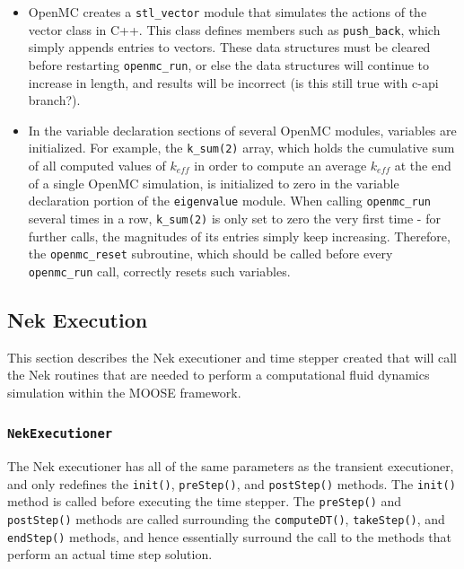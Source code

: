 \documentclass[10pt]{article}
\numberwithin{equation}{section} %
\begin{document}
\begin{itemize}
\item OpenMC creates a {\tt stl\_vector} module that simulates the actions of the vector class in C++. This class defines members such as {\tt push\_back}, which simply appends entries to vectors. These data structures must be cleared before restarting {\tt openmc\_run}, or else the data structures will continue to increase in length, and results will be incorrect (is this still true with c-api branch?).
\item In the variable declaration sections of several OpenMC modules, variables are initialized. For example, the {\tt k\_sum(2)} array, which holds the cumulative sum of all computed values of \(k_{eff}\) in order to compute an average \(k_{eff}\) at the end of a single OpenMC simulation, is initialized to zero in the variable declaration portion of the {\tt eigenvalue} module. When calling {\tt openmc\_run} several times in a row, {\tt k\_sum(2)} is only set to zero the very first time - for further calls, the magnitudes of its entries simply keep increasing. Therefore, the {\tt openmc\_reset} subroutine, which should be called before every {\tt openmc\_run} call, correctly resets such variables. 
\end{itemize}

\subsection{Nek Execution}
This section describes the Nek executioner and time stepper created that will call the Nek routines that are needed to perform a computational fluid dynamics simulation within the MOOSE framework.

\subsubsection{{\tt NekExecutioner}}
The Nek executioner has all of the same parameters as the transient executioner, and only redefines the {\tt init()}, {\tt preStep()}, and {\tt postStep()} methods. The {\tt init()} method is called before executing the time stepper. The {\tt preStep()} and {\tt postStep()} methods are called surrounding the {\tt computeDT()}, {\tt takeStep()}, and {\tt endStep()} methods, and hence essentially surround the call to the methods that perform an actual time step solution.  
\end{document}
